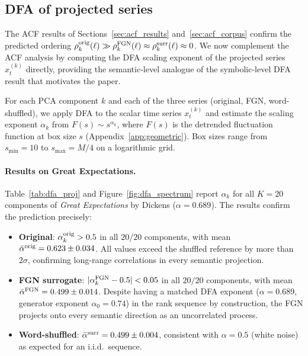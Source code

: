 \documentclass[12pt,a4paper]{article}
\begin{document}

\subsection{DFA of projected series}
\label{sec:dfa_projections}

The ACF results of Sections~\ref{sec:acf_results}
and~\ref{sec:acf_corpus} confirm the predicted ordering
$\rho_k^{\rm orig}(\ell) \gg \rho_k^{\rm FGN}(\ell) \approx
\rho_k^{\rm surr}(\ell) \approx 0$.
We now complement the ACF analysis by computing the DFA scaling
exponent of the projected series $x_t^{(k)}$ directly, providing the
semantic-level analogue of the
symbolic-level DFA result that motivates the paper.

For each PCA component $k$ and each of the three series
(original, FGN, word-shuffled), we apply DFA to the scalar
time series $x_t^{(k)}$ and estimate the scaling exponent
$\alpha_k$ from $F(s) \sim s^{\alpha_k}$, where $F(s)$ is the
detrended fluctuation function at box size $s$
(Appendix~\ref{app:geometric}).
Box sizes range from $s_{\min} = 10$ to $s_{\max} = M/4$
on a logarithmic grid.

\paragraph{Results on Great Expectations.}
Table~\ref{tab:dfa_proj} and Figure~\ref{fig:dfa_spectrum}
report $\alpha_k$ for all $K = 20$ components of
\emph{Great Expectations} by Dickens ($\alpha = 0.689$).
The results confirm the prediction precisely:

\begin{itemize}
  \item \textbf{Original}: $\alpha_k^{\rm orig} > 0.5$ in all
        $20/20$ components, with mean
        $\bar\alpha^{\rm orig} = 0.623 \pm 0.034$.
        All values exceed the shuffled reference by more than
        $2\sigma$, confirming long-range correlations in every
        semantic projection.

  \item \textbf{FGN surrogate}: $|\alpha_k^{\rm FGN} - 0.5| < 0.05$
        in all $20/20$ components, with mean
        $\bar\alpha^{\rm FGN} = 0.499 \pm 0.014$.
        Despite having a matched DFA exponent ($\alpha=0.689$,
        generator exponent $\alpha_0=0.74$) in the rank sequence
        by construction, the FGN projects
        onto every semantic direction as an uncorrelated process.

  \item \textbf{Word-shuffled}: $\bar\alpha^{\rm surr} =
        0.499 \pm 0.004$, consistent with $\alpha = 0.5$
        (white noise) as expected for an i.i.d.\ sequence.
\end{itemize}
\end{document}
